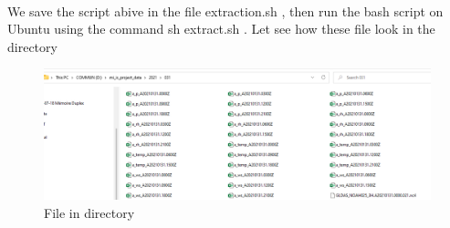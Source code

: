 \paragraph{}
We save the script abive in the file \scriptsize{extraction.sh} \normalsize, then run the bash script on Ubuntu using the command \scriptsize{ sh extract.sh} \normalsize.
\newline
Let see how these file look in the directory
\begin{figure}[H]
\begin{center}
\includegraphics[scale=0.6]{csv2.png} %
\end{center}
\caption{File in directory}
\label{File in directory}%
\end{figure}
